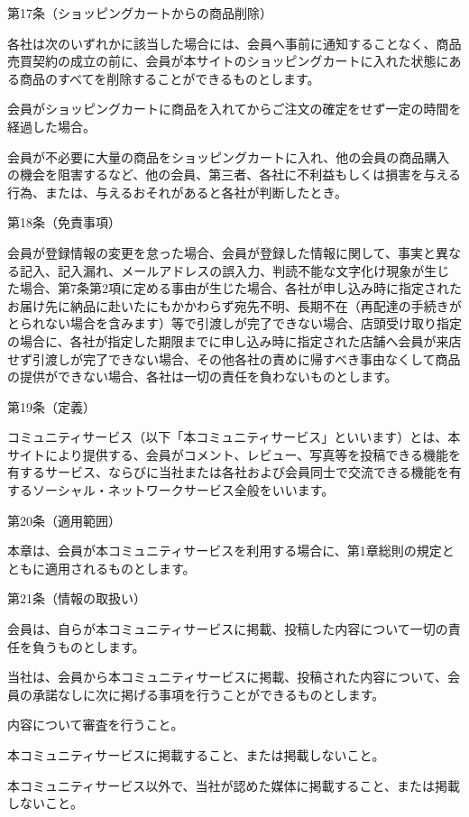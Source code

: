 第17条（ショッピングカートからの商品削除）

    各社は次のいずれかに該当した場合には、会員へ事前に通知することなく、商品売買契約の成立の前に、会員が本サイトのショッピングカートに入れた状態にある商品のすべてを削除することができるものとします。

        会員がショッピングカートに商品を入れてからご注文の確定をせず一定の時間を経過した場合。

        会員が不必要に大量の商品をショッピングカートに入れ、他の会員の商品購入の機会を阻害するなど、他の会員、第三者、各社に不利益もしくは損害を与える行為、または、与えるおそれがあると各社が判断したとき。

第18条（免責事項）

    会員が登録情報の変更を怠った場合、会員が登録した情報に関して、事実と異なる記入、記入漏れ、メールアドレスの誤入力、判読不能な文字化け現象が生じた場合、第7条第2項に定める事由が生じた場合、各社が申し込み時に指定されたお届け先に納品に赴いたにもかかわらず宛先不明、長期不在（再配達の手続きがとられない場合を含みます）等で引渡しが完了できない場合、店頭受け取り指定の場合に、各社が指定した期限までに申し込み時に指定された店舗へ会員が来店せず引渡しが完了できない場合、その他各社の責めに帰すべき事由なくして商品の提供ができない場合、各社は一切の責任を負わないものとします。

第19条（定義）

    コミュニティサービス（以下「本コミュニティサービス」といいます）とは、本サイトにより提供する、会員がコメント、レビュー、写真等を投稿できる機能を有するサービス、ならびに当社または各社および会員同士で交流できる機能を有するソーシャル・ネットワークサービス全般をいいます。
    
第20条（適用範囲）

    本章は、会員が本コミュニティサービスを利用する場合に、第1章総則の規定とともに適用されるものとします。

第21条（情報の取扱い）

    会員は、自らが本コミュニティサービスに掲載、投稿した内容について一切の責任を負うものとします。

    当社は、会員から本コミュニティサービスに掲載、投稿された内容について、会員の承諾なしに次に掲げる事項を行うことができるものとします。

        内容について審査を行うこと。

        本コミュニティサービスに掲載すること、または掲載しないこと。

        本コミュニティサービス以外で、当社が認めた媒体に掲載すること、または掲載しないこと。

